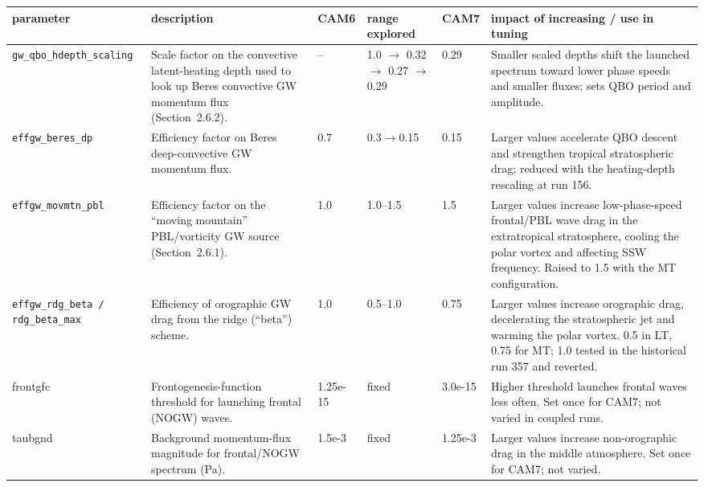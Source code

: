 \documentclass[draft]{agujournal2019}
\begin{document}
\scriptsize
 \begin{tabular}{p{2.3cm} p{3.1cm} p{0.9cm} p{1.8cm} p{1.0cm} p{4.2cm}}
  \hline
 parameter & description & CAM6 & range explored & CAM7 & impact of increasing / use in tuning \\
 \hline  \hline
\texttt{gw\_\allowbreak qbo\_\allowbreak hdepth\_\allowbreak scaling} &
Scale factor on the convective latent-heating depth used to look up Beres
convective GW momentum flux (Section~2.6.2). &
-- & 1.0 $\to$ 0.32 $\to$ 0.27 $\to$ 0.29 & 0.29 &
Smaller scaled depths shift the launched spectrum toward lower phase speeds
and smaller fluxes; sets QBO period and amplitude. \\

\texttt{effgw\_\allowbreak beres\_\allowbreak dp} &
Efficiency factor on Beres deep-convective GW momentum flux. &
0.7 & 0.3$\rightarrow$0.15 & 0.15 &
Larger values accelerate QBO descent and strengthen tropical stratospheric
drag; reduced with the heating-depth rescaling at run 156. \\

\texttt{effgw\_\allowbreak movmtn\_\allowbreak pbl} &
Efficiency factor on the ``moving mountain'' PBL/vorticity GW source
(Section~2.6.1). &
1.0 & 1.0--1.5 & 1.5 &
Larger values increase low-phase-speed frontal/PBL wave drag in the
extratropical stratosphere, cooling the polar vortex and affecting SSW
frequency. Raised to 1.5 with the MT configuration. \\

\texttt{effgw\_\allowbreak rdg\_\allowbreak beta / rdg\_\allowbreak beta\_\allowbreak max} &
Efficiency of orographic GW drag from the ridge (``beta'') scheme. &
1.0 & 0.5--1.0 & 0.75 &
Larger values increase orographic drag, decelerating the stratospheric jet
and warming the polar vortex. 0.5 in LT, 0.75 for MT; 1.0 tested in the
historical run 357 and reverted. \\

frontgfc &
Frontogenesis-function threshold for launching frontal (NOGW) waves. &
1.25e-15 & fixed & 3.0e-15 &
Higher threshold launches frontal waves less often. Set once for CAM7; not
varied in coupled runs. \\

taubgnd &
Background momentum-flux magnitude for frontal/NOGW spectrum (Pa). &
1.5e-3 & fixed & 1.25e-3 &
Larger values increase non-orographic drag in the middle atmosphere. Set once
for CAM7; not varied. \\
 \hline
 \hline
 \end{tabular}
\normalsize
\end{document}
